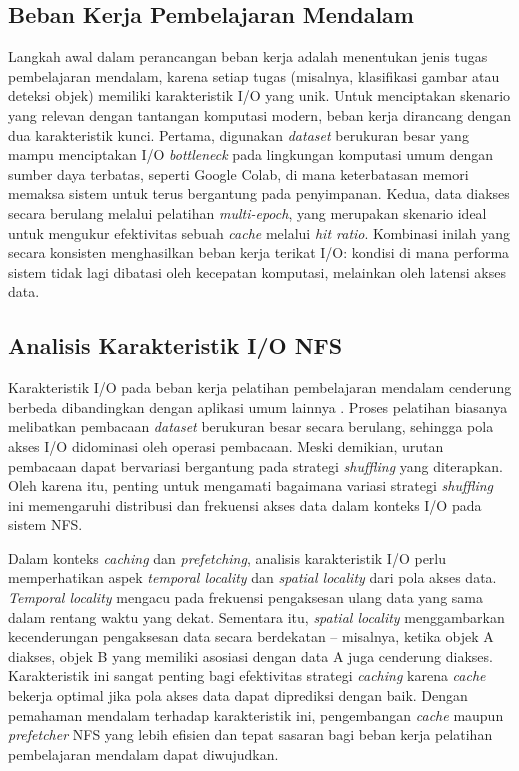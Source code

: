 \subsection{Beban Kerja Pembelajaran Mendalam}
Langkah awal dalam perancangan beban kerja adalah menentukan jenis tugas pembelajaran mendalam, karena setiap tugas (misalnya, klasifikasi gambar atau deteksi objek) memiliki karakteristik I/O yang unik. Untuk menciptakan skenario yang relevan dengan tantangan komputasi modern, beban kerja dirancang dengan dua karakteristik kunci. Pertama, digunakan \textit{dataset} berukuran besar yang mampu menciptakan I/O \textit{bottleneck} pada lingkungan komputasi umum dengan sumber daya terbatas, seperti Google Colab, di mana keterbatasan memori memaksa sistem untuk terus bergantung pada penyimpanan. Kedua, data diakses secara berulang melalui pelatihan \textit{multi-epoch}, yang merupakan skenario ideal untuk mengukur efektivitas sebuah \textit{cache} melalui \textit{hit ratio}. Kombinasi inilah yang secara konsisten menghasilkan beban kerja terikat I/O: kondisi di mana performa sistem tidak lagi dibatasi oleh kecepatan komputasi, melainkan oleh latensi akses data.

\subsection{Analisis Karakteristik I/O NFS}
Karakteristik I/O pada beban kerja pelatihan pembelajaran mendalam cenderung berbeda dibandingkan dengan aplikasi umum lainnya \parencite{360survey}. Proses pelatihan biasanya melibatkan pembacaan \textit{dataset} berukuran besar secara berulang, sehingga pola akses I/O didominasi oleh operasi pembacaan. Meski demikian, urutan pembacaan dapat bervariasi bergantung pada strategi \textit{shuffling} yang diterapkan. Oleh karena itu, penting untuk mengamati bagaimana variasi strategi \textit{shuffling} ini memengaruhi distribusi dan frekuensi akses data dalam konteks I/O pada sistem NFS.

Dalam konteks \textit{caching} dan \textit{prefetching}, analisis karakteristik I/O perlu memperhatikan aspek \textit{temporal locality} dan \textit{spatial locality} dari pola akses data. \textit{Temporal locality} mengacu pada frekuensi pengaksesan ulang data yang sama dalam rentang waktu yang dekat. Sementara itu, \textit{spatial locality} menggambarkan kecenderungan pengaksesan data secara berdekatan -- misalnya, ketika objek A diakses, objek B yang memiliki asosiasi dengan data A juga cenderung diakses. Karakteristik ini sangat penting bagi efektivitas strategi \textit{caching} karena \textit{cache} bekerja optimal jika pola akses data dapat diprediksi dengan baik. Dengan pemahaman mendalam terhadap karakteristik ini, pengembangan \textit{cache} maupun \textit{prefetcher} NFS yang lebih efisien dan tepat sasaran bagi beban kerja pelatihan pembelajaran mendalam dapat diwujudkan.


